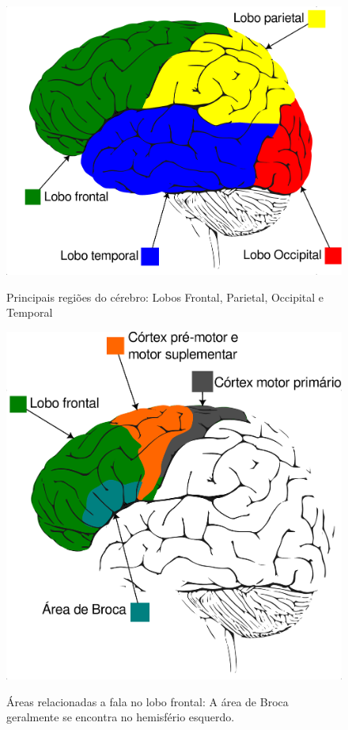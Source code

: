 			\begin{figure}[H]
				\centering
				\caption[Lobos Frontal, Parietal, Occipital e Temporal]{Principais regiões do cérebro: Lobos Frontal, Parietal, Occipital e Temporal}
				\includegraphics[width=0.65\linewidth]{images/lobosTelencefalo}
				\label{fig:lobostelencefalo}
			\end{figure}
			
			\begin{figure}[H]
				\centering
				\caption[Lobo frontal]{Áreas relacionadas a fala no lobo frontal: A área de Broca geralmente se encontra no hemisfério esquerdo.}
				\includegraphics[width=0.65\linewidth]{images/loboFrontal}
				\label{fig:lobofrontal}
			\end{figure}
			\newpage
			
